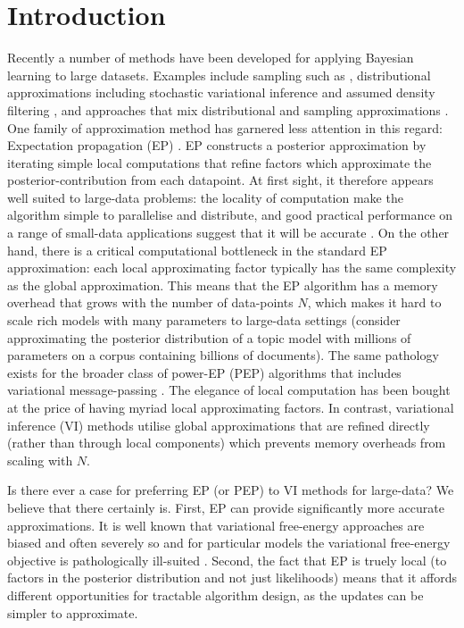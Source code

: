 \section{Introduction}


Recently a number of methods have been developed for applying Bayesian learning to large datasets. Examples include sampling such as \cite{ahn:distributedMCMC, bardenet:MCMC}, distributional approximations including stochastic variational inference \cite{hoffman:svi} and assumed density filtering \cite{miguel:pbp}, and approaches that mix distributional and sampling approximations \cite{gelman:dep,xu:sms}. 
%
One family of approximation method has garnered less attention in this regard: Expectation propagation (EP) \cite{minka:ep}\cite{opper:ec}. EP constructs a posterior approximation by iterating simple local computations that refine factors which approximate the posterior-contribution from each datapoint. At first sight, it therefore appears well suited to large-data problems: the locality of computation make the algorithm simple to parallelise and distribute, and good practical performance on a range of small-data applications suggest that it will be accurate \cite{kuss:gpep,barthelme:ep_likelihood,cunningham:gaussianEP}. On the other hand, there is a critical computational bottleneck in the standard EP approximation: each local approximating factor typically has the same complexity as the global approximation. This means that the EP algorithm has a memory overhead that grows with the number of data-points $N$, which makes it hard to scale rich models with many parameters to large-data settings (consider approximating the posterior distribution of a topic model with millions of parameters on a corpus containing billions of documents). The same pathology exists for the broader class of power-EP (PEP) algorithms \cite{minka:powerep} that includes variational message-passing \cite{winn:vmp}. The elegance of local computation has been bought at the price of having myriad local approximating factors. In contrast, variational inference (VI) methods \cite{jordan:variational,beal:variational} utilise global approximations that are refined directly (rather than through local components) which prevents memory overheads from scaling with $N$. 

Is there ever a case for preferring EP (or PEP) to VI methods for large-data?  We believe that there certainly is. First, EP can provide significantly more accurate approximations. It is well known that variational free-energy approaches are biased and often severely so \cite{turner+sahani:2011a} and for particular models the variational free-energy objective is pathologically ill-suited \cite{cunningham:gaussianEP,turner+sahani:2011c}. Second, the fact that EP is truely local (to factors in the posterior distribution and not just likelihoods) means that it affords different opportunities for tractable algorithm design, as the updates can be simpler to approximate.

